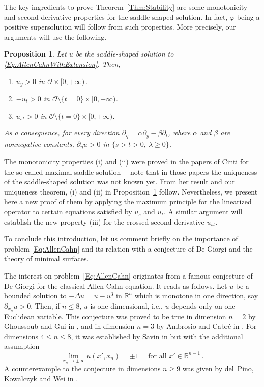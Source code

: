 \documentclass[12pt,reqno]{amsart}
\newtheorem{proposition}[theorem]{Proposition}
\theoremstyle{definition}
\theoremstyle{remark}
\newcommand{\con}[1]{\mathbb{#1}}
\newcommand{\R}{\con{R}} %
\newcommand{\ocal}{\mathcal{O}}
\numberwithin{equation}{section}
\begin{document}
The key ingredients to prove Theorem~\ref{Thm:Stability} are some monotonicity and second derivative properties for the saddle-shaped solution. In fact, $\varphi$ being a positive supersolution will follow from such properties. More precisely, our arguments will use the following.

\begin{proposition}
\label{Prop:MonotonicityProperties}
Let $u$ be the saddle-shaped solution to \eqref{Eq:AllenCahnWithExtension}. Then,
\begin{enumerate}[label=(\roman{*})]
\item $u_y > 0$ in $\ocal \times [0, +\infty)$\,.
\item $-u_t > 0$ in $\ocal \setminus \{ t= 0\} \times [0,+\infty)$.
\item $u_{st} > 0$ in $\ocal\setminus \{ t = 0\} \times [0,+\infty)$.
\end{enumerate}
As a consequence, for every direction $\partial_\eta = \alpha \partial_y - \beta \partial_t$, where $\alpha$ and $\beta$ are nonnegative constants, $\partial_\eta u > 0$ in $ \{s > t > 0,\ \lambda \geq 0\}$.
\end{proposition}

The monotonicity properties (i) and (ii) were proved in the papers of Cinti \cite{Cinti-Saddle,Cinti-Saddle2} for the so-called maximal saddle solution ---note that in those papers the uniqueness of the saddle-shaped solution was not known yet. From her result and our uniqueness theorem, (i) and (ii) in Proposition~\ref{Prop:MonotonicityProperties} follow. Nevertheless, we present here a new proof of them by applying the maximum principle for the linearized operator to certain equations satisfied by $u_s$ and $u_t$. A similar argument will establish the new property (iii) for the crossed second derivative $u_{st}$. 

To conclude this introduction, let us comment briefly on the importance of problem \eqref{Eq:AllenCahn} and its relation with a conjecture of De Giorgi and the theory of minimal surfaces.

The interest on problem~\eqref{Eq:AllenCahn} originates from a famous conjecture of De Giorgi for the classical Allen-Cahn equation. It reads as follows. Let $u$ be a bounded solution to $-\Delta  u = u - u^3 $ in $\R^n$ which is monotone in one direction, say $\partial_{x_n} u > 0$. Then, if $n\leq 8$, $u$ is one dimensional, i.e., $u$ depends only on one Euclidean variable. This conjecture was proved to be true in dimension $n=2$ by Ghoussoub and Gui in \cite{GhoussoubGui}, and in dimension $n=3$ by Ambrosio and Cabré in \cite{AmbrosioCabre}. For dimensions $4\leq n \leq 8$, it was established by Savin in \cite{Savin-DeGiorgi} but with the additional assumption 
\begin{equation}
\label{Eq:SavinCondition}
	\lim_{x_n \to \pm \infty} u(x',x_n) = \pm 1 \quad \text{ for all } x'\in \R^{n-1}\,.
\end{equation}
A counterexample to the conjecture in dimensions $n \geq 9$ was given by del~Pino, Kowalczyk and Wei in \cite{delPinoKowalczykWei}. 
\end{document}
